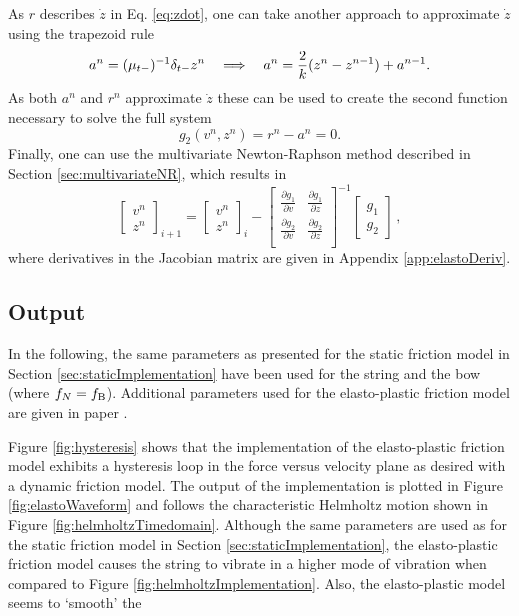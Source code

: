 As $r$ describes $\dot z$ in Eq. \eqref{eq:zdot}, one can take another approach to approximate $\dot z$ using the trapezoid rule \cite{theBible}
\begin{equation}
    a^n = (\mu_{t-})^{-1}\delta_{t-} z^n \quad \Longrightarrow\quad a^n = \frac{2}{k}(z^n - z^{n-1}) + a^{n-1}.
\end{equation}
As both $a^n$ and $r^n$ approximate $\dot z$ these can be used to create the second function necessary to solve the full system
\begin{equation}\label{eq:elastog2}
    g_2(v^n, z^n) = r^n - a^n = 0.
\end{equation}
Finally, one can use the multivariate Newton-Raphson method described in Section \ref{sec:multivariateNR}, which results in
\begin{equation}\label{eq:NRit}
    \begin{bmatrix}
    v^n\\
    z^n
    \end{bmatrix}_{i+1}
    =
    \begin{bmatrix}
    v^n\\
    z^n
    \end{bmatrix}_i
    -
    \begin{bmatrix}
    \frac{\partial g_1}{\partial v} & \frac{\partial g_1}{\partial z}\\
    \frac{\partial g_2}{\partial v} & \frac{\partial g_2}{\partial z}\\
    \end{bmatrix}^{-1}
    \begin{bmatrix}
    g_1\\
    g_2
    \end{bmatrix}\,
    ,
\end{equation}
where derivatives in the Jacobian matrix are given in Appendix \ref{app:elastoDeriv}.

\subsection{Output}
In the following, the same parameters as presented for the static friction model in Section \ref{sec:staticImplementation} have been used for the string and the bow (where $f_N = f_{\text{B}}$).
Additional parameters used for the elasto-plastic friction model are given in paper \citeP[C].

Figure \ref{fig:hysteresis} shows that the implementation of the elasto-plastic friction model exhibits a hysteresis loop in the force versus velocity plane as desired with a dynamic friction model.
The output of the implementation is plotted in Figure \ref{fig:elastoWaveform} and follows the characteristic Helmholtz motion shown in Figure 
\ref{fig:helmholtzTimedomain}. Although the same parameters are used as for the static friction model in Section \ref{sec:staticImplementation}, the elasto-plastic friction model causes the string to vibrate in a higher mode of vibration when compared to Figure \ref{fig:helmholtzImplementation}. Also, the elasto-plastic model seems to `smooth' the 



